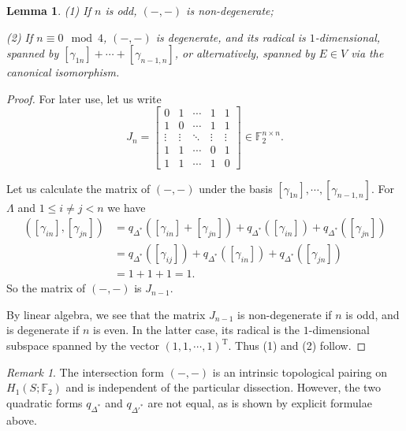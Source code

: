 \documentclass[11pt,reqno]{amsart}
\theoremstyle{plain}
\newtheorem{lemma}[theorem]{Lemma}
\theoremstyle{definition}
\theoremstyle{remark}
\newtheorem{remark}[theorem]{Remark}
\numberwithin{equation}{section}
\begin{document}
\begin{lemma}
    \par(1) If $n$ is odd, $(-,-)$ is non-degenerate;
    \par(2) If $n\equiv0\mod4$, $(-,-)$ is degenerate, and its radical is $1$-dimensional, spanned by $[\gamma_{1n}]+\cdots+[\gamma_{n-1,n}]$, or alternatively, spanned by $E\in V$ via the canonical isomorphism.
\end{lemma}
\begin{proof}
    \par For later use, let us write
    \[J_n=\begin{bmatrix}
        0&1&\cdots&1&1\\
        1&0&\cdots&1&1\\
        \vdots&\vdots&\ddots&\vdots&\vdots\\
        1&1&\cdots&0&1\\
        1&1&\cdots&1&0
    \end{bmatrix}\in\mathbb{F}_2^{n\times n}.\]
    \par Let us calculate the matrix of $(-,-)$ under the basis $[\gamma_{1n}],\cdots,[\gamma_{n-1,n}]$. For $\Lambda$ and $1\leq i\ne j<n$ we have
    \[\begin{aligned}
        ([\gamma_{in}],[\gamma_{jn}])
        &=q_{\Delta^*}([\gamma_{in}]+[\gamma_{jn}])+q_{\Delta^*}([\gamma_{in}])+q_{\Delta^*}([\gamma_{jn}])\\
        &=q_{\Delta^*}([\gamma_{ij}])+q_{\Delta^*}([\gamma_{in}])+q_{\Delta^*}([\gamma_{jn}])\\
        &=1+1+1
        =1.
    \end{aligned}\]
    So the matrix of $(-,-)$ is $J_{n-1}$.
    \par By linear algebra, we see that the matrix $J_{n-1}$ is non-degenerate if $n$ is odd, and is degenerate if $n$ is even. In the latter case, its radical is the $1$-dimensional subspace spanned by the vector $(1,1,\cdots,1)^{\mathrm{T}}$. Thus (1) and (2) follow.
\end{proof}
\begin{remark}
    The intersection form $(-,-)$ is an intrinsic topological pairing on $H_1(S;\mathbb{F}_2)$ and is independent of the particular dissection. However, the two quadratic forms $q_{\Delta^*}$ and $q_{\Delta'^*}$ are not equal, as is shown by explicit formulae above.
\end{remark}
\end{document}
